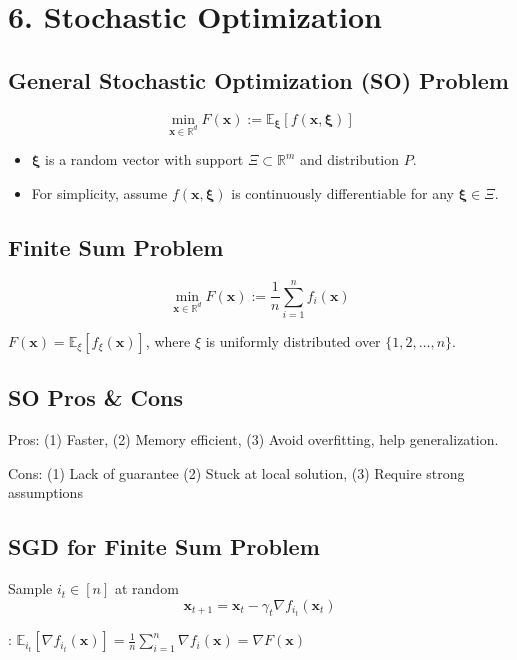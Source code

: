 \section*{6. Stochastic Optimization}
\subsection*{General Stochastic Optimization (SO) Problem}
$$
\min _{\mathbf{x} \in \mathbb{R}^{d}} F(\mathbf{x}):=\mathbb{E}_{\boldsymbol{\xi}}[f(\mathbf{x}, \boldsymbol{\xi})]
$$
\begin{itemize}[leftmargin=*]
    \item $\boldsymbol{\xi}$ is a random vector with support $\Xi \subset \mathbb{R}^{m}$ and distribution $P$. 
    \item For simplicity, assume $f(\mathbf{x}, \boldsymbol{\xi})$ is continuously differentiable for any $\boldsymbol{\xi} \in \Xi$. 
\end{itemize}





\subsection*{Finite Sum Problem}
$$
\min _{\mathbf{x} \in \mathbb{R}^{d}} F(\mathbf{x}):=\frac{1}{n} \sum_{i=1}^{n} f_{i}(\mathbf{x})
$$

$F(\mathbf{x})=\mathbb{E}_{\xi}\left[f_{\xi}(\mathbf{x})\right]$, where $\xi$ is uniformly distributed over $\{1,2, \ldots, n\}$.




\subsection*{SO Pros \& Cons}
Pros: (1) Faster, (2) Memory efficient, (3) Avoid overfitting, help generalization.

Cons: (1) Lack of guarantee (2) Stuck at local solution, (3) Require strong assumptions 




\subsection*{SGD for Finite Sum Problem}
Sample $i_{t} \in[n]$  at random
$$
\mathbf{x}_{t+1}=\mathbf{x}_{t}-\gamma_{t} \nabla f_{i_{t}}\left(\mathbf{x}_{t}\right)
$$

: $\mathbb{E}_{i_{t}}\left[\nabla f_{i_{t}}(\mathbf{x})\right]=\frac{1}{n} \sum_{i=1}^{n} \nabla f_{i}(\mathbf{x})=\nabla F(\mathbf{x})$


